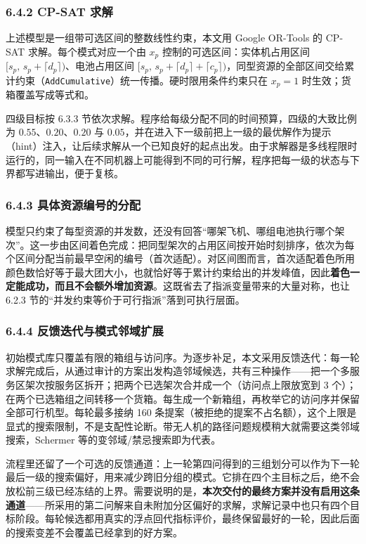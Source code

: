 \documentclass[withoutpreface,bwprint]{format}
\begin{document}
\subsubsection{6.4.2 CP-SAT 求解}
上述模型是一组带可选区间的整数线性约束，本文用 Google OR-Tools 的 CP-SAT 求解\cite{laborie2018}。每个模式对应一个由 $x_p$ 控制的可选区间：实体机占用区间 $[s_p,\, s_p + \lceil d_p \rceil)$、电池占用区间 $[s_p,\, s_p + \lceil d_p \rceil + \lceil c_p \rceil)$，同型资源的全部区间交给累计约束（\texttt{AddCumulative}）统一传播。硬时限用条件约束只在 $x_p = 1$ 时生效；货箱覆盖写成等式和。

四级目标按 6.3.3 节依次求解。程序给每级分配不同的时间预算，四级的大致比例为 $0.55$、$0.20$、$0.20$ 与 $0.05$，并在进入下一级前把上一级的最优解作为提示（hint）注入，让后续求解从一个已知良好的起点出发。由于求解器是多线程限时运行的，同一输入在不同机器上可能得到不同的可行解，程序把每一级的状态与下界都写进输出，便于复核。

\subsubsection{6.4.3 具体资源编号的分配}
模型只约束了每型资源的并发数，还没有回答“哪架飞机、哪组电池执行哪个架次”。这一步由区间着色完成：把同型架次的占用区间按开始时刻排序，依次为每个区间分配当前最早空闲的编号（首次适配）。对区间图而言，首次适配着色所用颜色数恰好等于最大团大小，也就恰好等于累计约束给出的并发峰值，因此\textbf{着色一定能成功，而且不会额外增加资源}。这既省去了指派变量带来的大量对称，也让 6.2.3 节的“并发约束等价于可行指派”落到可执行层面。

\subsubsection{6.4.4 反馈迭代与模式邻域扩展}
初始模式库只覆盖有限的箱组与访问序。为逐步补足，本文采用反馈迭代：每一轮求解完成后，从通过审计的方案出发构造邻域候选，共有三种操作——把一个多服务区架次按服务区拆开；把两个已选架次合并成一个（访问点上限放宽到 3 个）；在两个已选箱组之间转移一个货箱。每生成一个新箱组，再枚举它的访问序并保留全部可行机型。每轮最多接纳 160 条提案（被拒绝的提案不占名额），这个上限是显式的搜索限制，不是支配性论断。带无人机的路径问题规模稍大就需要这类邻域搜索，Schermer 等的变邻域/禁忌搜索即为代表\cite{schermer2019}。

流程里还留了一个可选的反馈通道：上一轮第四问得到的三组划分可以作为下一轮最后一级的搜索偏好，用来减少跨旧分组的模式。它排在四个主目标之后，绝不会放松前三级已经冻结的上界。需要说明的是，\textbf{本次交付的最终方案并没有启用这条通道}——所采用的第二问解来自未附加分区偏好的求解，求解记录中也只有四个目标阶段。每轮候选都用真实的浮点回代指标评价，最终保留最好的一轮，因此后面的搜索变差不会覆盖已经拿到的好方案。
\end{document}
